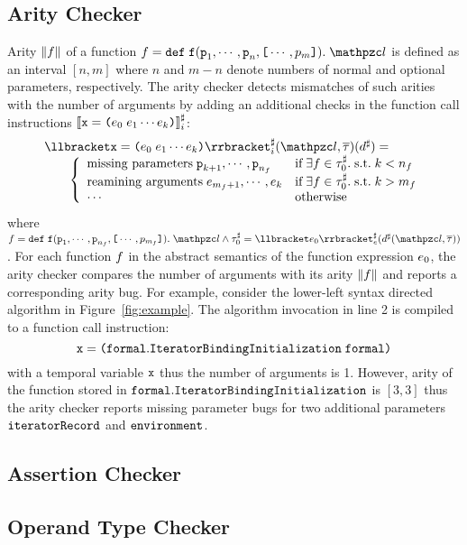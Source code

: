 \subsection{Arity Checker}
Arity $\lVert{f}\rVert$ of a function $\func = \kwdef \; \f (\p_1, \cdots, \p_n,
\kwsl \cdots, p_m \kwsr). \; \lab$ is defined as an interval $[n, m]$ where $n$
and $m-n$ denote numbers of normal and optional parameters, respectively.  The
arity checker detects mismatches of such arities with the number of arguments by
adding an additional checks in the function call instructions ${\llbracket{\texttt{x}= \texttt{(}e_0 \; e_1 \cdots e_k \texttt{)}}\rrbracket}^\sharp_i$:
\[
  \begin{array}{l}
    \asemi{\x = \kwrl \expr_0 \; \expr_1 \cdots \expr_k \kwrr}(\lab,
    \tys)(\aelem) =\\
    \qquad \left\{
      \begin{array}{ll}
        \text{missing parameters} \; \p_{k+1}, \cdots, \p_{n_\func} &
        \text{if} \; \exists \func \in \aty_0. \; \text{s.t.} \; k < n_\func\\

        \text{reamining arguments} \; \expr_{m_\func+1}, \cdots, \expr_k &
        \text{if} \; \exists \func \in \aty_0. \; \text{s.t.} \; k > m_\func\\

        \cdots &
        \text{otherwise}\\
      \end{array}
    \right.\\
  \end{array}
\]
where $\func = \kwdef \; \f (\p_1, \cdots, \p_{n_\func}, \kwsl \cdots,
p_{m_\func} \kwsr). \; \lab \wedge \aty_0 = \aseme{\expr_0}(\aelem(\lab,
\tys))$.  For each function $f$ in the abstract semantics of the function
expression $e_0$, the arity checker compares the number of arguments with
its arity $\lVert{f}\rVert$ and reports a corresponding arity bug.  For example,
consider the lower-left syntax directed algorithm in Figure~\ref{fig:example}.
The algorithm invocation in line 2 is compiled to a function call instruction:
\[
  \texttt{x} = \texttt{(} \texttt{formal}.\texttt{IteratorBindingInitialization} \; \texttt{formal}
  \texttt{)}
\]
with a temporal variable $\texttt{x}$ thus the number of arguments is 1.  However, arity
of the function stored in $\texttt{formal}.\texttt{IteratorBindingInitialization}$
is $[3, 3]$ thus the arity checker reports missing parameter bugs for two
additional parameters $\texttt{iteratorRecord}$ and $\texttt{environment}$.

\subsection{Assertion Checker}
\todo


\subsection{Operand Type Checker}
\todo
